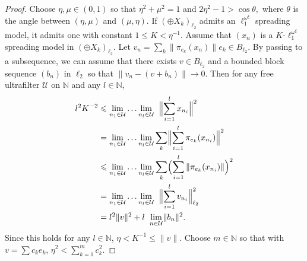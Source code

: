 \documentclass[12pt]{amsart}
\theoremstyle{definition}
\newcommand{\nn}{\mathbb{N}}
\newcommand{\uuu}{\mathcal{U}}
\begin{document}
\begin{proof} Choose $\eta, \mu \in  (0,1)$ so that $\eta^2+\mu^2=1$ and $2\eta^2-1>\cos \theta,$ where $\theta$ is the angle between $(\eta, \mu)$ and $(\mu, \eta)$. If $(\oplus X_k)_{\ell_2}$ admits an $\ell_1^{\omega^\xi}$ spreading model, it admits one with constant $1\leqslant K<\eta^{-1}$.  Assume that $(x_n)$ is a $K$-$\ell_1^{\omega^\xi}$ spreading model in $(\oplus X_k)_{\ell_2}$.  Let $v_n=\sum_k \|\pi_{e_k}(x_n)\|e_k\in B_{\ell_2}$.  By passing to a subsequence, we can assume that there exists $v\in B_{\ell_2}$ and a bounded block sequence $(b_n)$ in $\ell_2$ so that $\|v_n- (v+b_n)\|\to 0$.  Then for any free ultrafilter $\uuu$ on $\nn$ and any $l\in \nn$, \begin{align*} l^2 K^{-2} & \leqslant \underset{n_1\in \uuu}{\lim}\ldots \underset{n_l\in \uuu}{\lim}\hspace{2mm} \Bigl\|\sum_{i=1}^l x_{n_i}\Bigr\|^2 \\ &  = \underset{n_1\in \uuu}{\lim}\ldots \underset{n_l\in \uuu}{\lim} \sum_k \Bigl\|\sum_{i=1}^l \pi_{e_k}(x_{n_i})\Bigr\|^2 \\ & \leqslant \underset{n_1\in \uuu}{\lim}\ldots \underset{n_l\in \uuu}{\lim} \sum_k \Bigl(\sum_{i=1}^l \|\pi_{e_k}(x_{n_i})\|\Bigr)^2\\ & = \underset{n_1\in \uuu}{\lim}\ldots \underset{n_l\in \uuu}{\lim}\hspace{2mm} \Bigl\|\sum_{i=1}^l v_{n_i}\Bigr\|_{\ell_2}^2 \\ & = l^2\|v\|^2+l \hspace{2mm} \underset{n\in \uuu}{\lim}\|b_n\|^2. \end{align*} Since this holds for any $l\in \nn$, $\eta <K^{-1}\leqslant  \|v\|$.  Choose $m\in \nn$ so that with $v=\sum c_ke_k$, $\eta^2< \sum_{k=1}^m c_k^2$.  


\end{proof}
\end{document}
